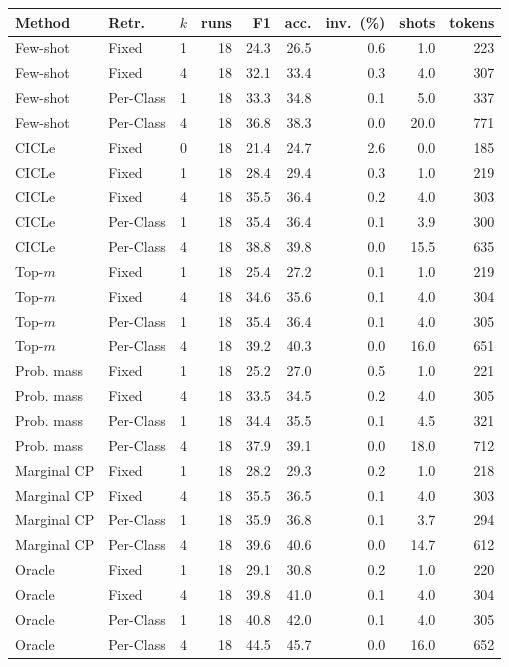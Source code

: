 \begin{tabular}{llrrrrrrr}
\toprule
Method & Retr. & $k$ & runs & F1 & acc. & inv.\ (\%) & shots & tokens \\
\midrule
Few-shot & Fixed & 1 & 18 & 24.3 & 26.5 & 0.6 & 1.0 & 223 \\
Few-shot & Fixed & 4 & 18 & 32.1 & 33.4 & 0.3 & 4.0 & 307 \\
Few-shot & Per-Class & 1 & 18 & 33.3 & 34.8 & 0.1 & 5.0 & 337 \\
Few-shot & Per-Class & 4 & 18 & 36.8 & 38.3 & 0.0 & 20.0 & 771 \\
CICLe & Fixed & 0 & 18 & 21.4 & 24.7 & 2.6 & 0.0 & 185 \\
CICLe & Fixed & 1 & 18 & 28.4 & 29.4 & 0.3 & 1.0 & 219 \\
CICLe & Fixed & 4 & 18 & 35.5 & 36.4 & 0.2 & 4.0 & 303 \\
CICLe & Per-Class & 1 & 18 & 35.4 & 36.4 & 0.1 & 3.9 & 300 \\
CICLe & Per-Class & 4 & 18 & 38.8 & 39.8 & 0.0 & 15.5 & 635 \\
\midrule
Top-$m$ & Fixed & 1 & 18 & 25.4 & 27.2 & 0.1 & 1.0 & 219 \\
Top-$m$ & Fixed & 4 & 18 & 34.6 & 35.6 & 0.1 & 4.0 & 304 \\
Top-$m$ & Per-Class & 1 & 18 & 35.4 & 36.4 & 0.1 & 4.0 & 305 \\
Top-$m$ & Per-Class & 4 & 18 & 39.2 & 40.3 & 0.0 & 16.0 & 651 \\
Prob. mass & Fixed & 1 & 18 & 25.2 & 27.0 & 0.5 & 1.0 & 221 \\
Prob. mass & Fixed & 4 & 18 & 33.5 & 34.5 & 0.2 & 4.0 & 305 \\
Prob. mass & Per-Class & 1 & 18 & 34.4 & 35.5 & 0.1 & 4.5 & 321 \\
Prob. mass & Per-Class & 4 & 18 & 37.9 & 39.1 & 0.0 & 18.0 & 712 \\
Marginal CP & Fixed & 1 & 18 & 28.2 & 29.3 & 0.2 & 1.0 & 218 \\
Marginal CP & Fixed & 4 & 18 & 35.5 & 36.5 & 0.1 & 4.0 & 303 \\
Marginal CP & Per-Class & 1 & 18 & 35.9 & 36.8 & 0.1 & 3.7 & 294 \\
Marginal CP & Per-Class & 4 & 18 & 39.6 & 40.6 & 0.0 & 14.7 & 612 \\
Oracle & Fixed & 1 & 18 & 29.1 & 30.8 & 0.2 & 1.0 & 220 \\
Oracle & Fixed & 4 & 18 & 39.8 & 41.0 & 0.1 & 4.0 & 304 \\
Oracle & Per-Class & 1 & 18 & 40.8 & 42.0 & 0.1 & 4.0 & 305 \\
Oracle & Per-Class & 4 & 18 & 44.5 & 45.7 & 0.0 & 16.0 & 652 \\
\bottomrule
\end{tabular}
